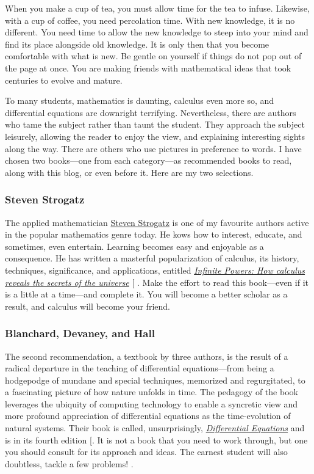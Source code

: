 \documentclass[
  a4paper,
]{article}
\begin{document}
When you make a cup of tea, you must allow time for the tea to infuse.
Likewise, with a cup of coffee, you need percolation time. With new
knowledge, it is no different. You need time to allow the new knowledge
to steep into your mind and find its place alongside old knowledge. It
is only then that you become comfortable with what is new. Be gentle on
yourself if things do not pop out of the page at once. You are making
friends with mathematical ideas that took centuries to evolve and
mature.

To many students, mathematics is daunting, calculus even more so, and
differential equations are downright terrifying. Nevertheless, there are
authors who tame the subject rather than taunt the student. They
approach the subject leisurely, allowing the reader to enjoy the view,
and explaining interesting sights along the way. There are others who
use pictures in preference to words. I have chosen two books---one from
each category---as recommended books to read, along with this blog, or
even before it. Here are my two selections.

\subsubsection{Steven Strogatz}\label{steven-strogatz}

The applied mathematician
\href{https://en.wikipedia.org/wiki/Steven_Strogatz}{Steven Strogatz} is
one of my favourite authors active in the popular mathematics genre
today. He kows how to interest, educate, and sometimes, even entertain.
Learning becomes easy and enjoyable as a consequence. He has written a
masterful popularization of calculus, its history, techniques,
significance, and applications, entitled
\href{https://www.stevenstrogatz.com/books/infinite-powers}{\emph{Infinite
Powers: How calculus reveals the secrets of the universe}}
{[}\citeproc{ref-strogatz-2019}{1}{]} . Make the effort to read this
book---even if it is a little at a time---and complete it. You will
become a better scholar as a result, and calculus will become your
friend.

\subsubsection{Blanchard, Devaney, and
Hall}\label{blanchard-devaney-and-hall}

The second recommendation, a textbook by three authors, is the result of
a radical departure in the teaching of differential equations---from
being a hodgepodge of mundane and special techniques, memorized and
regurgitated, to a fascinating picture of how nature unfolds in time.
The pedagogy of the book leverages the ubiquity of computing technology
to enable a syncretic view and more profound appreciation of
differential equations as the time-evolution of natural systems. Their
book is called, unsurprisingly,
\href{http://math.bu.edu/odes/4ed-TOC.html}{\emph{Differential
Equations}} and is in its fourth edition
{[}\citeproc{ref-blanchard-devaney-hall-2012}{2}{]}. It is not a book
that you need to work through, but one you should consult for its
approach and ideas. The earnest student will also doubtless, tackle a
few problems!  \normalfont.
\end{document}
